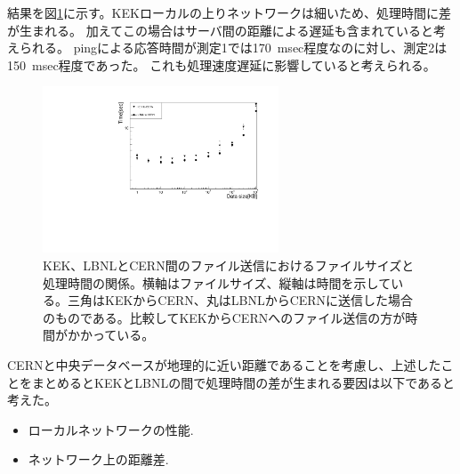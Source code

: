 結果を図\ref{datasize_vs_time_cern}に示す。KEKローカルの上りネットワークは細いため、処理時間に差が生まれる。
加えてこの場合はサーバ間の距離による遅延も含まれていると考えられる。
pingによる応答時間が測定1では170~msec程度なのに対し、測定2は150~msec程度であった。
これも処理速度遅延に影響していると考えられる。

\begin{figure}[bpt]\centering
  \begin{center}
    \includegraphics[width=7cm,angle=270]{./scp_to_cern.pdf}
  \caption[KEK、LBNLとCERN間のファイル送信におけるファイルサイズと処理時間の関係]{KEK、LBNLとCERN間のファイル送信におけるファイルサイズと処理時間の関係。横軸はファイルサイズ、縦軸は時間を示している。三角はKEKからCERN、丸はLBNLからCERNに送信した場合のものである。比較してKEKからCERNへのファイル送信の方が時間がかかっている。}
  \label{datasize_vs_time_cern}
  \end{center}
\end{figure}

CERNと中央データベースが地理的に近い距離であることを考慮し、上述したことをまとめるとKEKとLBNLの間で処理時間の差が生まれる要因は以下であると考えた。
\begin{itemize}
  \item ローカルネットワークの性能.
  \item ネットワーク上の距離差.
\end{itemize}

